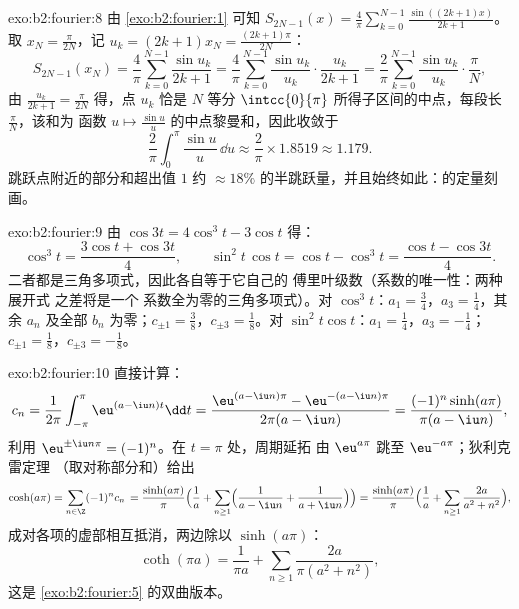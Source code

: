 \begin{solution}{exo:b2:fourier:8}
由 \cref{exo:b2:fourier:1} 可知 $S_{2N-1}(x) =
\frac4\pi\sum_{k=0}^{N-1}\frac{\sin((2k+1)x)}{2k+1}$。取 $x_N =
\frac{\pi}{2N}$，记 $u_k = (2k+1)x_N = \frac{(2k+1)\pi}{2N}$：
\[
S_{2N-1}(x_N) = \frac{4}{\pi}\sum_{k=0}^{N-1}\frac{\sin u_k}{2k+1}
= \frac{4}{\pi}\sum_{k=0}^{N-1}\frac{\sin u_k}{u_k}\cdot
\frac{u_k}{2k+1}
= \frac{2}{\pi}\sum_{k=0}^{N-1}\frac{\sin u_k}{u_k}\cdot
\frac{\pi}{N},
\]
由 $\frac{u_k}{2k+1} = \frac{\pi}{2N}$ 得，点 $u_k$ 恰是 $N$
等分 $\intcc{0}{\pi}$ 所得子区间的中点，每段长
$\frac{\pi}{N}$，该和为
函数 $u \mapsto \frac{\sin u}{u}$ 的中点黎曼和，因此收敛于
\[
\frac{2}{\pi}\int_0^\pi \frac{\sin u}{u}\,\dd u
\approx \frac{2}{\pi}\times 1.8519 \approx 1.179 .
\]
跳跃点附近的部分和超出值 $1$ 约 $\approx
18\%$ 的半跳跃量，并且始终如此：的定量刻画。
\end{solution}

\begin{solution}{exo:b2:fourier:9}
由 $\cos 3t = 4\cos^3t - 3\cos t$ 得：
\[
\cos^3 t = \frac{3\cos t + \cos 3t}{4},
\qquad
\sin^2t\,\cos t = \cos t - \cos^3 t
= \frac{\cos t - \cos 3t}{4} .
\]
二者都是三角多项式，因此各自等于它自己的
傅里叶级数（系数的唯一性：两种展开式
之差将是一个
系数全为零的三角多项式）。对 $\cos^3t$：$a_1 = \frac34$，$a_3 =
\frac14$，其余 $a_n$ 及全部 $b_n$ 为零；$c_{\pm1} =
\frac38$，$c_{\pm3} = \frac18$。对 $\sin^2t\cos t$：$a_1 =
\frac14$，$a_3 = -\frac14$；$c_{\pm1} = \frac18$，$c_{\pm3} =
-\frac18$。
\end{solution}

\begin{solution}{exo:b2:fourier:10}
直接计算：
\[
c_n = \frac{1}{2\pi}\int_{-\pi}^{\pi}\eu^{(a - \iu n)t}\dd t
= \frac{\eu^{(a-\iu n)\pi} - \eu^{-(a - \iu n)\pi}}
{2\pi(a - \iu n)}
= \frac{(-1)^n\sinh(a\pi)}{\pi(a - \iu n)} ,
\]
利用 $\eu^{\pm\iu n\pi} = (-1)^n$。在 $t = \pi$ 处，周期延拓
由 $\eu^{a\pi}$ 跳至 $\eu^{-a\pi}$；狄利克雷定理
（取对称部分和）给出
\[
\cosh(a\pi) = \sum_{n\in\Z}(-1)^n c_n\,
= \frac{\sinh(a\pi)}{\pi}\Bigl(\frac1a +
\sum_{n\geq1}\Bigl(\frac{1}{a - \iu n} +
\frac{1}{a + \iu n}\Bigr)\Bigr)
= \frac{\sinh(a\pi)}{\pi}\Bigl(\frac1a +
\sum_{n\geq1}\frac{2a}{a^2 + n^2}\Bigr) ,
\]
成对各项的虚部相互抵消，两边除以
$\sinh(a\pi)$：
\[
\coth(\pi a) = \frac{1}{\pi a} +
\sum_{n\geq1}\frac{2a}{\pi(a^2 + n^2)} ,
\]
这是 \cref{exo:b2:fourier:5} 的双曲版本。
\end{solution}

